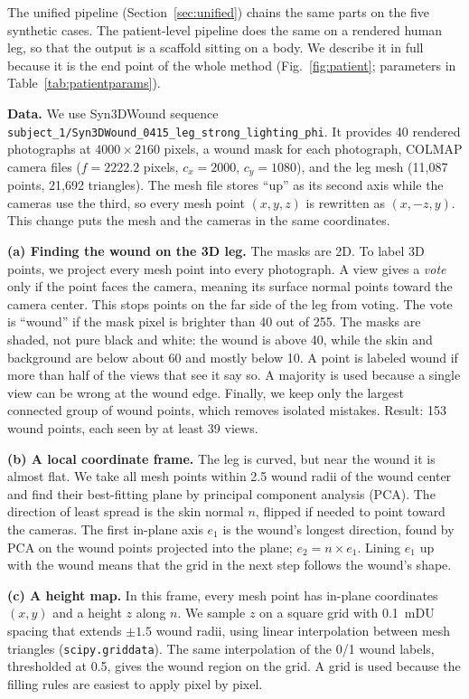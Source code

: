 \documentclass[conference]{IEEEtran}
\begin{document}
The unified pipeline (Section~\ref{sec:unified}) chains the same parts on
the five synthetic cases. The patient-level pipeline does the same on a
rendered human leg, so that the output is a scaffold sitting on a body. We
describe it in full because it is the end point of the whole method
(Fig.~\ref{fig:patient}; parameters in Table~\ref{tab:patientparams}).

\textbf{Data.} We use Syn3DWound sequence
\texttt{subject\_1/Syn3DWound\_0415\_leg\_strong\_lighting\_phi}. It
provides 40 rendered photographs at $4000\times2160$ pixels, a wound mask for
each photograph, COLMAP camera files ($f=2222.2$ pixels,
$c_x=2000$, $c_y=1080$), and the leg mesh (11{,}087 points, 21{,}692
triangles). The mesh file stores ``up'' as its second axis while the cameras
use the third, so every mesh point $(x,y,z)$ is rewritten as $(x,-z,y)$.
This change puts the mesh and the cameras in the same coordinates.

\textbf{(a) Finding the wound on the 3D leg.} The masks are 2D. To label 3D
points, we project every mesh point into every photograph. A view gives a
\emph{vote} only if the point faces the camera, meaning its surface normal
points toward the camera center. This stops points on the far side of the
leg from voting. The vote is ``wound'' if the mask pixel is brighter than
40 out of 255. The masks are shaded, not pure black and white: the wound is
above 40, while the skin and background are below about 60 and mostly below
10. A point is labeled wound if more than half of the views that see it say
so. A majority is used because a single view can be wrong at the wound edge.
Finally, we keep only the largest connected group of wound points, which
removes isolated mistakes. Result: 153 wound points, each seen by at least
39 views.

\textbf{(b) A local coordinate frame.} The leg is curved, but near the wound
it is almost flat. We take all mesh points within 2.5 wound radii of the
wound center and find their best-fitting plane by principal component
analysis (PCA). The direction of least spread is the skin normal $n$, flipped
if needed to point toward the cameras. The first in-plane axis $e_1$ is the
wound's longest direction, found by PCA on the wound points projected into
the plane; $e_2 = n \times e_1$. Lining $e_1$ up with the wound means that
the grid in the next step follows the wound's shape.

\textbf{(c) A height map.} In this frame, every mesh point has in-plane
coordinates $(x,y)$ and a height $z$ along $n$. We sample $z$ on a square
grid with 0.1~mDU spacing that extends $\pm1.5$ wound radii, using linear
interpolation between mesh triangles (\texttt{scipy.griddata}). The same
interpolation of the 0/1 wound labels, thresholded at 0.5, gives the wound
region on the grid. A grid is used because the filling rules are easiest to
apply pixel by pixel.
\end{document}

